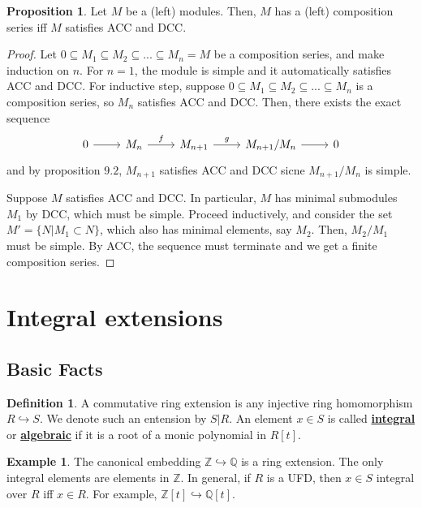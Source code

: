 \documentclass{article}
\theoremstyle{definition}
\theoremstyle{definition}
\theoremstyle{definition}
\newtheorem{proposition}{Proposition}[section]
\theoremstyle{definition}
\theoremstyle{definition}
\newtheorem{definition}{Definition}[section]
\theoremstyle{definition}
\theoremstyle{definition}
\newtheorem{example}{Example}[section]
\begin{document}
\begin{tcolorbox}[colback=blue!5!white,colframe=blue!30!white]
\begin{proposition}
Let $M$ be a (left) modules. Then, $M$ has a (left) composition series iff $M$ satisfies ACC and DCC. 
\end{proposition}
\end{tcolorbox}
\begin{proof}
    Let $0\subseteq M_1\subseteq M_2\subseteq ...\subseteq M_n=M$ be a composition series, and make induction on $n$. For $n=1$, the module is simple and it automatically satisfies ACC and DCC. For inductive step, suppose $0\subseteq M_1\subseteq M_2\subseteq ...\subseteq M_n$ is a composition series, so $M_n$ satisfies ACC and DCC. Then, there exists the exact sequence 
    \[\begin{tikzcd}
    0\arrow[r]&M_n\arrow[r,"f"]&M_{n+1}\arrow[r,"g"]&M_{n+1}/M_n\arrow[r]&0
    \end{tikzcd}\]
    and by proposition $9.2$, $M_{n+1}$ satisfies ACC and DCC sicne $M_{n+1}/M_n$ is simple. 

    Suppose $M$ satisfies ACC and DCC. In particular, $M$ has minimal submodules $M_1$ by DCC, which must be simple. Proceed inductively, and consider the set $M'=\{N|M_1\subset N\}$, which also has minimal elements, say $M_2$. Then, $M_2/M_1$ must be simple. By ACC, the sequence must terminate and we get a finite composition series. 
\end{proof}

\section{Integral extensions}

\subsection{Basic Facts}
\begin{tcolorbox}[colback=purple!5!white,colframe=purple!75!black]
\begin{definition}
A commutative ring extension is any injective ring homomorphism $R\hookrightarrow S$. We denote such an entension by $S|R$. An element $x\in S$ is called \underline{\textbf{integral}} or \underline{\textbf{algebraic}} if it is a root of a monic polynomial in $R[t]$. 
\end{definition}
\end{tcolorbox}


\begin{tcolorbox}[colback=yellow!5!white,colframe=yellow!30!white]
\begin{example}
The canonical embedding $\mathbb{Z}\hookrightarrow \mathbb{Q}$ is a ring extension. The only integral elements are elements in $\mathbb{Z}$. In general, if $R$ is a UFD, then $x\in S$ integral over $R$ iff $x\in R$. For example, $\mathbb{Z}[t]\hookrightarrow \mathbb{Q}[t]$. 
\end{example}
\end{tcolorbox}
\end{document}
